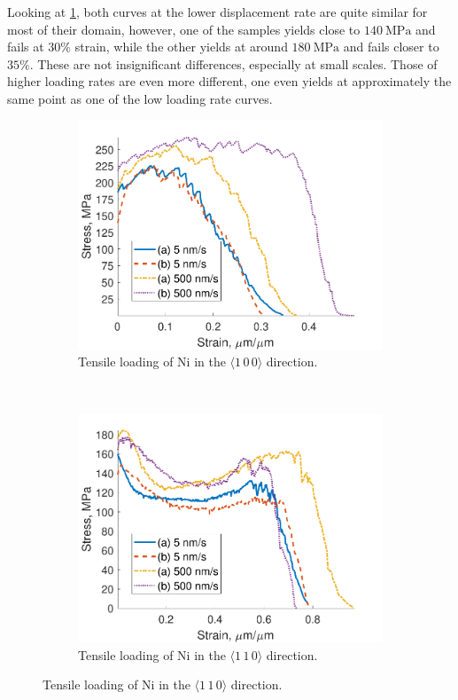 Looking at \cref{sf:Ni100}, both curves at the lower displacement rate are quite similar for most of their domain, however, one of the samples yields close to $\SI{140}{\mega\pascal}$ and fails at $30\%$ strain, while the other yields at around $\SI{180}{\mega\pascal}$ and fails closer to $35\%$. These are not insignificant differences, especially at small scales. Those of higher loading rates are even more different, one even yields at approximately the same point as one of the low loading rate curves.
\begin{figure}
    \centering
    \begin{subfigure}[t]{0.45\linewidth}
        \centering
        \includegraphics[width=\linewidth]{../data/Ni100.pdf}
        \caption[Tensile loading of Ni in the $\langle 1\, 0\, 0 \rangle$ direction.]{Tensile loading of Ni in the $\langle 1\, 0\, 0 \rangle$ direction.}
        \label{sf:Ni100}
    \end{subfigure}
    ~
    \begin{subfigure}[t]{0.45\linewidth}
        \centering
        \includegraphics[width=\linewidth]{../data/Ni110.pdf}
        \caption[Tensile loading of Ni in the $\langle 1\, 1\, 0 \rangle$ direction.]{Tensile loading of Ni in the $\langle 1\, 1\, 0 \rangle$ direction.}
        \label{sf:Ni110}
    \end{subfigure}


\end{figure}
